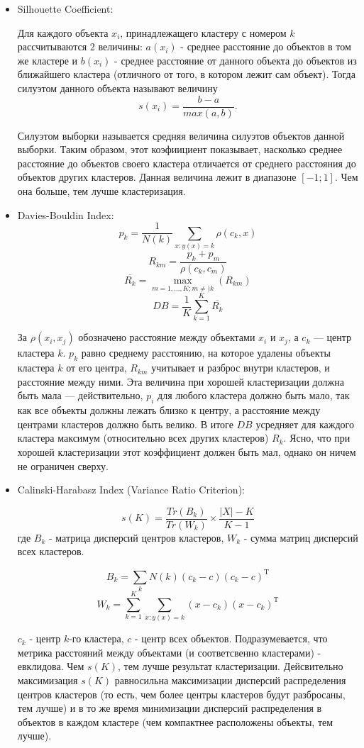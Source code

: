 \documentclass[12pt,fleqn]{article}
\begin{document}
\begin{itemize}
  \item Silhouette Coefficient:

  Для каждого объекта $x_i$, принадлежащего кластеру с номером $k$ рассчитываются 2 величины: $a(x_i)$ - среднее расстояние до объектов в том же кластере и $b(x_i)$ - среднее расстояние от данного объекта до объектов из ближайшего кластера (отличного от того, в котором лежит сам объект). Тогда силуэтом данного объекта называют величину
  $$ s(x_i) = \frac{b-a}{max(a, b)} .$$

  Силуэтом выборки называется средняя величина силуэтов объектов данной выборки. Таким образом, этот коэфиициент показывает, насколько среднее расстояние до объектов своего кластера отличается от среднего расстояния до объектов других кластеров. Данная величина лежит в диапазоне $[-1; 1]$. Чем она больше, тем лучше кластеризация.


  \item Davies-Bouldin Index:
    $$ p_k = \frac{1}{N(k)}\sum_{x:y(x) = k}^{}\rho(c_k, x) $$
    $$ R_{km} = \frac{p_k + p_m}{\rho(c_k, c_m)} $$
    $$ \overline{R_k} = \underset{m = 1, \dots, K; m \neq) k}{\max}(R_{km}) $$
    $$DB = \frac{1}{K} \sum_{k=1}^{K}\overline{R_k} $$

    За $\rho(x_i, x_j)$ обозначено расстояние между объектами $x_i$ и $x_j$, а $c_k$ --- центр кластера $k$.  $p_k$ равно среднему  расстоянию, на которое удалены объекты кластера $k$ от его центра, $R_{km}$ учитывает и разброс внутри кластеров, и расстояние между ними. Эта величина при хорошей кластеризации должна быть мала --- действительно, $p_i$ для любого кластера должно быть мало, так как все объекты должны лежать близко к центру, а расстояние между центрами кластеров должно быть велико. В итоге $DB$ усредняет для каждого кластера максимум (относительно всех других кластеров) $R_k$. Ясно, что при хорошей кластеризации этот коэффициент должен быть мал, однако он ничем не ограничен сверху.


  \item Calinski-Harabasz Index (Variance Ratio Criterion):

  $$s(K)= \frac{Tr(B_k)}{Tr(W_k)} \times \frac{|X|-K}{K-1}$$
  где $B_k$ - матрица дисперсий центров кластеров, $W_k$ - сумма матриц дисперсий всех кластеров.

  $$B_k = \sum_{k}^{}N(k)(c_k-c)(c_k-c)^\mathrm{T}$$
  $$W_k = \sum_{k=1}^{K}\sum_{x:y(x)=k}^{}(x-c_k)(x-c_k)^\mathrm{T}$$

  $c_k$ - центр $k$-го кластера, $c$ - центр всех объектов. Подразумевается, что метрика расстояний между объектами (и соответсвенно кластерами) - евклидова.
  Чем $s(K)$, тем лучше результат кластеризации. Дейсвительно максимизация $s(K)$ равносильна максимизации дисперсий распределения центров кластеров (то есть, чем более центры кластеров будут разбросаны, тем лучше) и в то же время минимизации дисперсий распределения в объектов в каждом кластере (чем компактнее расположены объекты, тем лучше).


\end{itemize}
\end{document}
